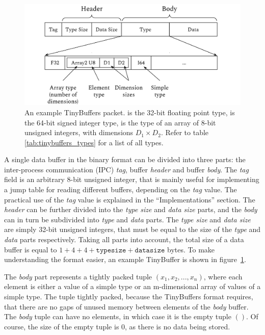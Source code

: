 \begin{figure}[t]
    \centering\includegraphics[width=\textwidth]{figures/tinybuffers.png}
    \caption{An example TinyBuffers packet.  is the 32-bit floating point type,  is the 64-bit signed integer type,  is the type of an array of 8-bit unsigned integers, with dimensions $D_1 \times D_2$. Refer to table \ref{tab:tinybuffers_types} for a list of all types.}\label{fig:tinybuffer_packet}
\end{figure}

A single data buffer in the  binary format can be divided into three parts: the inter-process communication (IPC) \emph{tag}, buffer \emph{header} and buffer \emph{body}. The \emph{tag} field is an arbitrary 8-bit unsigned integer, that is mainly useful for implementing a jump table for reading different buffers, depending on the \emph{tag} value. The practical use of the \emph{tag} value is explained in the ``Implementations'' section. The \emph{header} can be further divided into the \emph{type size} and \emph{data size} parts, and the \emph{body} can in turn be subdivided into \emph{type} and \emph{data} parts. The \emph{type size} and \emph{data size} are simply 32-bit unsigned integers, that must be equal to the size of the \emph{type} and \emph{data} parts respectively. Taking all parts into account, the total size of a data buffer is equal to $1 + 4 + 4 + \texttt{typesize} + \texttt{datasize}$ bytes. To make understanding the format easier, an example TinyBuffer is shown in figure~\ref{fig:tinybuffer_packet}.

The \emph{body} part represents a tightly packed tuple $(x_1, x_2, ..., x_n)$, where each element is either a value of a simple type or an m-dimensional array of values of a simple type. The tuple tightly packed, because the TinyBuffers format requires, that there are no gaps of unused memory between elements of the \emph{body} buffer. The \emph{body} tuple can have no elements, in which case it is the empty tuple $()$. Of course, the size of the empty tuple is 0, as there is no data being stored.

